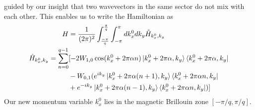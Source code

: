 guided by our insight that two wavevectors in the same sector do not mix with each other. This enables us to write the Hamiltonian as \cite{bernevig2013topological}
\begin{align}
 H &= \frac{1}{(2\pi)^2}\int_{\frac{-\pi}{q}}^{\frac{\pi}{q}}\int_{-\pi}^{\pi}{dk_{x}^{0}dk_{y} \hat{H}_{k_x^0,k_y}} \\
 \hat{H}_{k_x^0,k_y} = \sum_{n=0}^{q-1} &[-2W_{1,0}\cos(k_{x}^{0} + 2\pi\alpha n)\ket{k_x^{0}+2\pi\alpha,k_y}\bra{k_x^{0}+2\pi\alpha,k_y} \nonumber \\
 &- W_{0,1}(e^{ik_y}\ket{k_x^{0}+2\pi\alpha(n+1),k_y}\bra{k_x^{0}+2\pi\alpha n,k_y} \nonumber \\
 &+ e^{-ik_y}\ket{k_x^{0}+2\pi\alpha(n-1),k_y}\bra{k_x^{0}+2\pi\alpha n,k_y})] 
\end{align} Our new momentum variable $k_{x}^0$ lies in the magnetic Brillouin zone $[-\pi/q, \pi/q]$.

